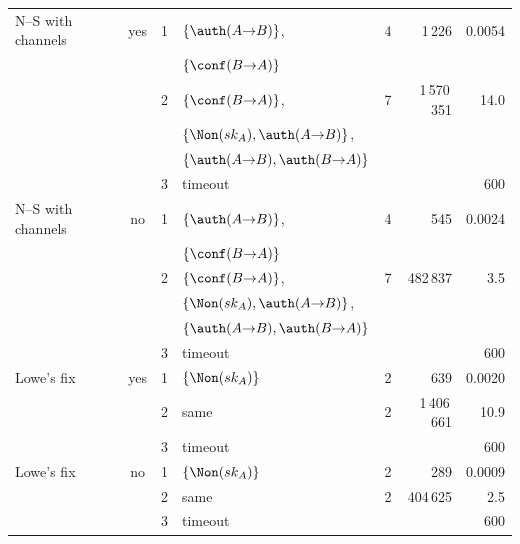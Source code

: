 \begin{table}[tbp]
\begin{tabular}{l c c l r r r}
\addlinespace[2pt]
N--S with channels & yes & 1 & $\{\auth(A{\to}B)\}$, & 4 & 1\,226 & 0.0054\\
 & & & $\{\conf(B{\to}A)\}$ & & & \\
 &  & 2 & $\{\conf(B{\to}A)\}$, & 7 & 1\,570\,351 & 14.0\\
 & & & $\{\Non(sk_A), \auth(A{\to}B)\}$, & & & \\
 & & & $\{\auth(A{\to}B), \auth(B{\to}A)\}$ & & & \\
 &  & 3 & \multicolumn{3}{l}{timeout} & 600\\
\addlinespace[2pt]
N--S with channels & no & 1 & $\{\auth(A{\to}B)\}$, & 4 & 545 & 0.0024\\
 & & & $\{\conf(B{\to}A)\}$ & & & \\
 &  & 2 & $\{\conf(B{\to}A)\}$, & 7 & 482\,837 & 3.5\\
 & & & $\{\Non(sk_A), \auth(A{\to}B)\}$, & & & \\
 & & & $\{\auth(A{\to}B), \auth(B{\to}A)\}$ & & & \\
 &  & 3 & \multicolumn{3}{l}{timeout} & 600\\
\addlinespace[2pt]
Lowe's fix & yes & 1 & $\{\Non(sk_A)\}$ & 2 & 639 & 0.0020\\
 &  & 2 & same & 2 & 1\,406\,661 & 10.9\\
 &  & 3 & \multicolumn{3}{l}{timeout} & 600\\
\addlinespace[2pt]
Lowe's fix & no & 1 & $\{\Non(sk_A)\}$ & 2 & 289 & 0.0009\\
 &  & 2 & same & 2 & 404\,625 & 2.5\\
 &  & 3 & \multicolumn{3}{l}{timeout} & 600\\
\bottomrule
\end{tabular}
\end{table}
